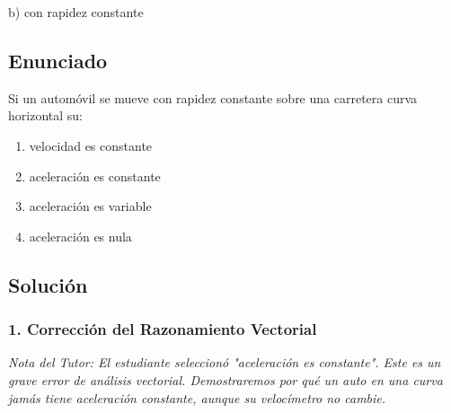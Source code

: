 \documentclass[12pt, a4paper]{article}
\begin{document}
\begin{tcolorbox}[colback=green!5!white, colframe=green!50!black, title=Respuesta Final]
\centering \Large b) con rapidez constante
\end{tcolorbox}

\newpage

\subsection*{Enunciado}
Si un automóvil se mueve con rapidez constante sobre una carretera curva horizontal su:
\begin{enumerate}[label=\alph*)]
    \item velocidad es constante
    \item aceleración es constante
    \item aceleración es variable
    \item aceleración es nula
\end{enumerate}


\subsection*{Solución}

\subsubsection*{1. Corrección del Razonamiento Vectorial}
\textit{Nota del Tutor: El estudiante seleccionó "aceleración es constante". Este es un grave error de análisis vectorial. Demostraremos por qué un auto en una curva jamás tiene aceleración constante, aunque su velocímetro no cambie.}
\end{document}
